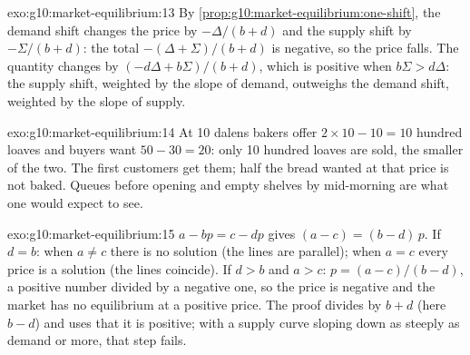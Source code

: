 \begin{solution}{exo:g10:market-equilibrium:13}
By \cref{prop:g10:market-equilibrium:one-shift}, the demand shift changes the price by $-\Delta/(b+d)$ and the supply shift by $-\Sigma/(b+d)$: the
total $-(\Delta + \Sigma)/(b + d)$ is negative, so the price falls. The quantity changes by $(-d\Delta + b\Sigma)/(b+d)$, which is positive when $b\Sigma >
d\Delta$: the supply shift, weighted by the slope of demand, outweighs the demand shift, weighted by the slope of supply.
\end{solution}

\begin{solution}{exo:g10:market-equilibrium:14}
At 10 dalens bakers offer $2 \times 10 - 10 = 10$ hundred loaves and buyers want $50 - 30 = 20$: only 10 hundred loaves are sold, the smaller of the
two. The first customers get them; half the bread wanted at that price is not baked. Queues before opening and empty shelves by mid-morning are what
one would expect to see.
\end{solution}

\begin{solution}{exo:g10:market-equilibrium:15}
$a - bp = c - dp$ gives $(a - c) = (b - d)\,p$. If $d = b$: when $a \ne c$ there is no solution (the lines are parallel); when $a = c$ every price is a
solution (the lines coincide). If $d > b$ and $a > c$: $p = (a - c)/(b - d)$, a positive number divided by a negative one, so the price is negative and
the market has no equilibrium at a positive price. The proof divides by $b + d$ (here $b - d$) and uses that it is positive; with a supply curve
sloping down as steeply as demand or more, that step fails.
\end{solution}

